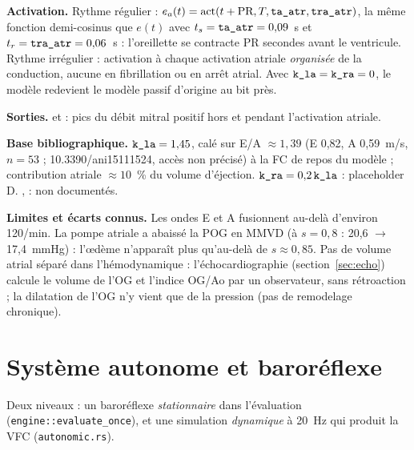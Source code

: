 \documentclass[10pt,a4paper]{article}
\newcommand{\cmd}[1]{\texttt{#1}}
\newcommand{\vp}[1]{\text{\texttt{\detokenize{#1}}}}
\newcommand{\limite}[1]{\par\textbf{Limites et écarts connus.} #1}
\newcommand{\sources}[1]{\par\textbf{Base bibliographique.} #1}
\begin{document}
\textbf{Activation.} Rythme régulier : $e_a(t) = \mathrm{act}(t + \text{PR}, T, \vp{ta_atr}, \vp{tra_atr})$, la même fonction demi-cosinus que $e(t)$ avec $t_s = \vp{ta_atr} = 0{,}09$~s et $t_r = \vp{tra_atr} = 0{,}06$~s : l'oreillette se contracte PR secondes avant le ventricule. Rythme irrégulier : activation à chaque activation atriale \emph{organisée} de la conduction, aucune en fibrillation ou en arrêt atrial. Avec $\vp{k_la} = \vp{k_ra} = 0$, le modèle redevient le modèle passif d'origine au bit près.

\textbf{Sorties.} \vp{mitral_e} et \vp{mitral_a} : pics du débit mitral positif hors et pendant l'activation atriale.

\sources{$\vp{k_la} = 1{,}45$, calé sur E/A $\approx 1{,}39$ (E 0,82, A 0,59~m/s, $n = 53$ ; 10.3390/ani15111524, accès non précisé) à la FC de repos du modèle ; contribution atriale $\approx 10$~\% du volume d'éjection. $\vp{k_ra} = 0{,}2\,\vp{k_la}$ : placeholder D. \vp{ta_atr}, \vp{tra_atr} : non documentés.}

\limite{Les ondes E et A fusionnent au-delà d'environ 120/min. La pompe atriale a abaissé la POG en MMVD (à $s = 0{,}8$ : 20,6 $\to$ 17,4~mmHg) : l'œdème n'apparaît plus qu'au-delà de $s \approx 0{,}85$. Pas de volume atrial séparé dans l'hémodynamique : l'échocardiographie (section~\ref{sec:echo}) calcule le volume de l'OG et l'indice OG/Ao par un observateur, sans rétroaction ; la dilatation de l'OG n'y vient que de la pression (pas de remodelage chronique).}

\section{Système autonome et baroréflexe}\label{sec:auto}

Deux niveaux : un baroréflexe \emph{stationnaire} dans l'évaluation (\cmd{engine::evaluate\_once}), et une simulation \emph{dynamique} à 20~Hz qui produit la VFC (\cmd{autonomic.rs}).
\end{document}
